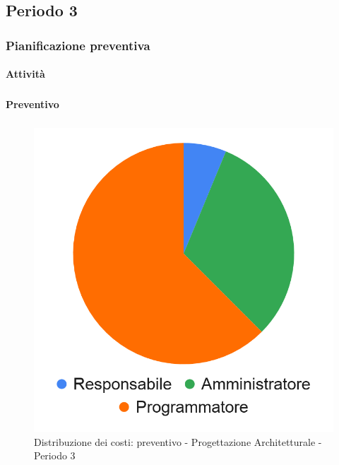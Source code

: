 \pafTable{
	
}



\pagebreak
\subsection{Periodo 3}

\subsubsection{Pianificazione preventiva}

\paragraph{Attività}
\subparagraph*{}

\planningTable{
	
}

\paragraph{Preventivo}
\subparagraph*{}


\hspace{-1cm}
\begin{minipage}{.50\textwidth}
\smallPreventivoTable{
	
}
\end{minipage}
\hspace{1cm}
\begin{minipage}{.40\textwidth}
\begin{figure}[H]
	\includegraphics[scale=0.21]{res/images/charts/preventivo_priori/Grafico4-5.png}
	\caption{Distribuzione dei costi: preventivo - Progettazione Architetturale - Periodo 3}
\end{figure}
\end{minipage} 


